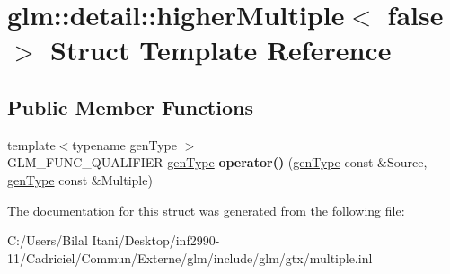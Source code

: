 \hypertarget{structglm_1_1detail_1_1higher_multiple_3_01false_01_4}{}\section{glm\+:\+:detail\+:\+:higher\+Multiple$<$ false $>$ Struct Template Reference}
\label{structglm_1_1detail_1_1higher_multiple_3_01false_01_4}
\subsection*{Public Member Functions}
\begin{DoxyCompactItemize}
\item 
{\footnotesize template$<$typename gen\+Type $>$ }\\G\+L\+M\+\_\+\+F\+U\+N\+C\+\_\+\+Q\+U\+A\+L\+I\+F\+I\+ER \hyperlink{structglm_1_1detail_1_1gen_type}{gen\+Type} {\bfseries operator()} (\hyperlink{structglm_1_1detail_1_1gen_type}{gen\+Type} const \&Source, \hyperlink{structglm_1_1detail_1_1gen_type}{gen\+Type} const \&Multiple)\hypertarget{structglm_1_1detail_1_1higher_multiple_3_01false_01_4_ae121db4aac2a541989b912b3966bffdb}{}\label{structglm_1_1detail_1_1higher_multiple_3_01false_01_4_ae121db4aac2a541989b912b3966bffdb}

\end{DoxyCompactItemize}


The documentation for this struct was generated from the following file\+:\begin{DoxyCompactItemize}
\item 
C\+:/\+Users/\+Bilal Itani/\+Desktop/inf2990-\/11/\+Cadriciel/\+Commun/\+Externe/glm/include/glm/gtx/multiple.\+inl\end{DoxyCompactItemize}
